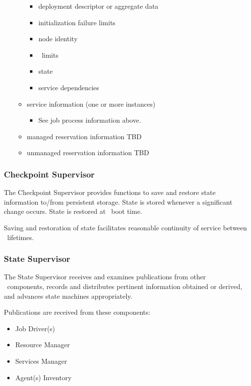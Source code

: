 \begin{itemize}
\begin{itemize}
\begin{itemize}
          \item deployment descriptor or aggregate data
          \item initialization failure limits
          \item node identity
          \item \varLinuxControlGroup~limits
          \item state
          \item service dependencies
        \end{itemize} 
      \item service information (one or more instances)
        \begin{itemize}
          \item See job process information above.
        \end{itemize} 

      \item managed reservation information
        TBD      
      \item unmanaged reservation information
        TBD          

    \end{itemize} 
  \end{itemize}    


  \subsubsection{Checkpoint Supervisor} 
    
    The Checkpoint Supervisor provides functions to save and restore state information
    to/from persistent storage. State is stored whenever a significant change occurs.
    State is restored at \varOrchestrator~boot time.
    
    Saving and restoration of state facilitates reasonable continuity of service
    between \varOrchestrator~lifetimes.
    
    \subsubsection{State Supervisor} 

    The State Supervisor receives and examines publications from other
    \varDUCC~components, records and distributes pertinent information obtained
    or derived, and advances state machines appropriately.
    
    Publications are received from these components:
    
    \begin{itemize}
    
    \item Job Driver(s)
    \item Resource Manager
    \item Services Manager
    \item Agent(s) Inventory
      
    \end{itemize} 
    
